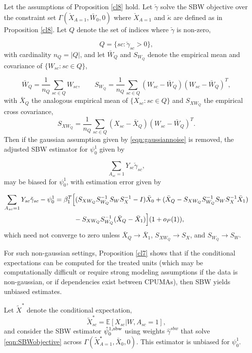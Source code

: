 \begin{proposition}\label{cl9}
Let the assumptions of Proposition \ref{cl8} hold. Let $\check{\gamma}$ solve the SBW objective over the constraint set $\Gamma(\check{X}_{A=1}, \bar{W}_0, 0)$ where $\check{X}_{A=1}$ and $\check{\kappa}$ are defined as in Proposition \ref{cl8}. Let $Q$ denote the set of indices where $\check{\gamma}$ is non-zero,

\[ Q = \{sc: \check{\gamma}_{sc} > 0\},\]
with cardinality $n_Q = |Q|$, and let $\bar{W}_Q$ and $S_{W_Q}$ denote the empirical mean and covariance of $\{W_{sc}:sc \in Q\}$,

\[ \bar{W}_Q = \frac{1}{n_Q}\sum_{sc \in Q} W_{sc},\qquad S_{W_Q} = \frac{1}{n_Q} \sum_{sc \in Q} (W_{sc} - \bar{W}_Q)(W_{sc} - \bar{W}_Q)^T,\]
with $\bar{X}_Q$ the analogous empirical mean of $\{X_{sc}:sc \in Q\}$ and $S_{XW_Q}$ the empirical cross covariance,
\[ S_{XW_Q} = \frac{1}{n_Q} \sum_{sc \in Q} (X_{sc} - \bar{X}_Q)(W_{sc} - \bar{W}_Q)^T.\]
Then if the gaussian assumption given by \eqref{eqn:gaussiannoise} is removed, the adjusted SBW estimator for $\psi_0^1$ given by 

\[\sum_{A_{sc}=1} Y_{sc} \check{\gamma}_{sc},\]
may be biased for $\psi_0^1$, with estimation error given by 

\begin{align} 
\nonumber \sum_{A_{sc}=1} Y_{sc} \check{\gamma}_{sc} - \psi_0^1 & = \beta_1^T\Big[(S_{XW_Q}S_{W_Q}^{-1}S_WS_X^{-1} - I)\bar{X}_0  + (\bar{X}_Q - S_{XW_Q}S_{W_Q}^{-1} S_W S_X^{-1} \bar{X}_1) \\
& \hskip1cm {} - S_{XW_Q}S_{W_Q}^{-1}(\bar{X}_Q - \bar{X}_1)\Big](1 + o_P(1)),  \label{eqn:cl9.error}
\end{align}
which need not converge to zero unless $\bar{X}_Q \to \bar{X}_1$, $S_{XW_Q} \to S_X$, and $S_{W_Q} \to S_W$.
\end{proposition}

For such non-gaussian settings, Proposition \ref{cl7} shows that if the conditional expectations can be computed for the treated units (which may be computationally difficult or require strong modeling assumptions if the data is non-gaussian, or if dependencies exist between CPUMAs), then SBW yields unbiased estimates. 

\begin{proposition}\label{cl7}
    Let $\tilde{X}^*$ denote the conditional expectation,
    \[\tilde{X}^*_{sc} = \mathbb{E}[X_{sc} | W, A_{sc}=1],\]
    and consider the SBW estimator $\hat{\psi}_0^{1, \textup{sbw}}$ using weights $\hat{\gamma}^{sbw}$ that solve \eqref{eqn:SBWobjective} across $\Gamma(\tilde{X}^\star_{A=1}, \bar{X}_0, 0)$. This estimator is unbiased for $\psi_0^1$.
\end{proposition}

